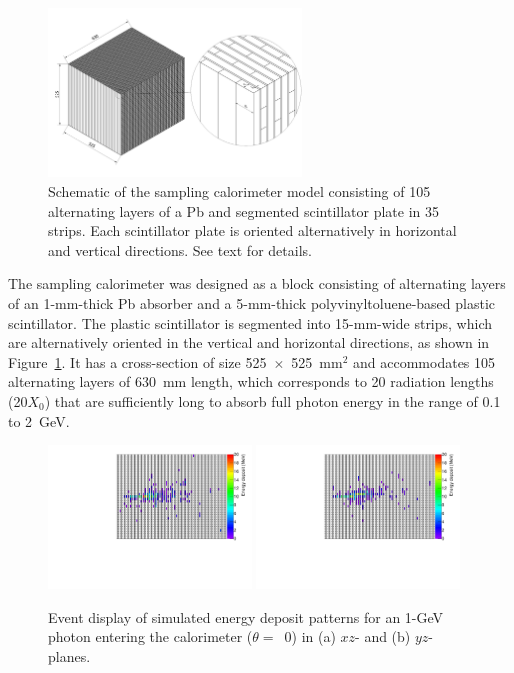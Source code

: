\documentclass[preprint,12pt,times,a4paper]{elsarticle}
\begin{document}
\begin{figure}[!hbt]
\centering
\includegraphics[width=0.6\textwidth]{figures/Fig1_detector_schematic.jpeg}
\caption{ Schematic of the sampling calorimeter model consisting of 105 alternating layers of a Pb and segmented scintillator plate in 35 strips. Each scintillator plate is oriented alternatively in horizontal and vertical directions. See text for details. }
\label{fig:det_conf}
\end{figure}


The sampling calorimeter was designed as a block consisting of alternating layers of an 1-mm-thick Pb absorber and a 5-mm-thick polyvinyltoluene-based plastic scintillator. The plastic scintillator is segmented into 15-mm-wide strips, which are alternatively oriented in the vertical and horizontal directions, as shown in Figure~\ref{fig:det_conf}. It has a cross-section of size 525~$\times$~525~mm$^{2}$ and accommodates 105 alternating layers of 630~mm length, which corresponds to 20 radiation lengths (20$X_{0}$) that are sufficiently long to absorb full photon energy in the range of 0.1 to 2~GeV.

\begin{figure}[!hbt]
\centering
\includegraphics[width=0.48\textwidth]{figures/Fig2_EMShower_XZ.pdf}
\includegraphics[width=0.48\textwidth]{figures/Fig2_EMShower_YZ.pdf}
\caption{ Event display of simulated energy deposit patterns for an 1-GeV photon entering the calorimeter ($\theta=$~0) in (a) $xz$- and (b) $yz$-planes.}
\label{fig:Evt_Dis}
\end{figure}
\end{document}
